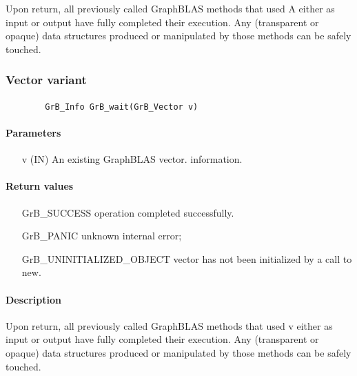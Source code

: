 {Upon return, all previously called GraphBLAS methods that used {\sf A} either as 
input or output have fully completed their execution.
Any (transparent or opaque) data structures produced or manipulated by those 
methods can be safely touched.


\subsubsection{Vector variant}

\paragraph{\syntax}

\begin{verbatim}
        GrB_Info GrB_wait(GrB_Vector v)
\end{verbatim}

\paragraph{Parameters}

\begin{itemize}[leftmargin=1.1in]
	    \item[{\sf v}]   ({\sf IN})     An existing GraphBLAS vector.
information.
\end{itemize}

\paragraph{Return values}
\begin{itemize}[leftmargin=2.1in]
\item[{\sf GrB\_SUCCESS}]	operation completed successfully.
\item[{\sf GrB\_PANIC}]		unknown internal error;
\item[{\sf GrB\_UNINITIALIZED\_OBJECT}]  vector has not been initialized by a
                            call to {\sf new}.
\end{itemize}

\paragraph{Description}

Upon return, all previously called GraphBLAS methods that used {\sf v} either as
input or output have fully completed their execution.  Any (transparent or opaque)
data structures produced or manipulated by those methods can be safely touched.
}
